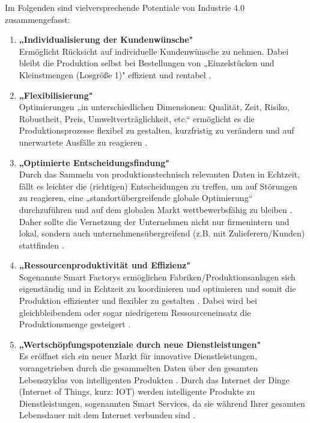 \newline
Im Folgenden sind vielversprechende Potentiale von Industrie 4.0 zusammengefasst:
\begin{enumerate}
	\item \textbf{„Individualisierung der Kundenwünsche"} \cite[S.19]{12} \\
	Ermöglicht Rücksicht auf individuelle Kundenwünsche zu nehmen. Dabei bleibt die 
	Produktion selbst bei Bestellungen von „Einzelstücken und Kleinstmengen (Losgröße 1)" \cite[S.19]{12} effizient und rentabel \cite[S.19]{12}.
	\item \textbf{„Flexibilisierung"} \cite[S.20]{12} \\
	Optimierungen „in unterschiedlichen Dimensionen: Qualität, Zeit, Risiko, Robustheit, Preis,
	Umweltverträglichkeit, etc.“ ermöglicht es die Produktionsprozesse flexibel zu gestalten,
	kurzfristig zu verändern und auf unerwartete Ausfälle zu reagieren \cite[S.20]{12}.
	\item \textbf{„Optimierte Entscheidungsfindung"} \cite[S.20]{12} \\
	Durch das Sammeln von produktionstechnisch relevanten Daten in Echtzeit, fällt es leichter
	die (richtigen) Entscheidungen zu treffen, um auf Störungen zu reagieren, eine
	„standortübergreifende globale Optimierung“ \cite[S.20]{12} durchzuführen und auf dem globalen Markt wettbewerbsfähig zu bleiben \cite[S.20]{12}. Daher sollte die Vernetzung der 
	Unternehmen nicht nur firmenintern und lokal, sondern auch unternehmensübergreifend (z.B. mit Zulieferern/Kunden) stattfinden \cite{6}.
	\item \textbf{„Ressourcenproduktivität und Effizienz"} \cite[S.20]{12} \\
	Sogenannte Smart Factorys ermöglichen Fabriken/Produktionsanlagen sich eigenständig und in Echtzeit zu koordinieren und optimieren und somit die Produktion effizienter und flexibler zu gestalten \cite{6}. Dabei wird bei gleichbleibendem oder sogar niedrigerem Ressourceneinsatz die Produktionsmenge gesteigert \cite[S.20]{12}.
	\item \textbf{„Wertschöpfungspotenziale durch neue Dienstleistungen"} \cite[S.20]{12} \\
	Es eröffnet sich ein neuer Markt für innovative Dienstleistungen, vorangetrieben durch die
	gesammelten Daten über den gesamten Lebenszyklus von intelligenten Produkten 
	\cite[S.20]{12}. Durch das Internet der Dinge (Internet of Things, kurz: IOT)
	werden intelligente Produkte zu Dienstleistungen, sogenannten Smart Services, da sie 
	während Ihrer gesamten Lebensdauer mit dem Internet verbunden sind \cite{6}.

\end{enumerate}
